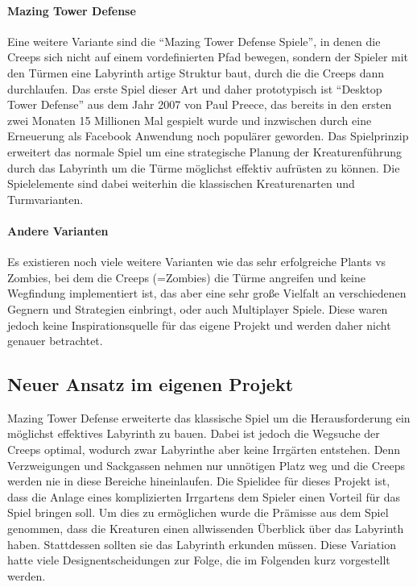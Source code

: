 \paragraph{Mazing Tower Defense}
Eine weitere Variante sind die \enquote{Mazing Tower Defense Spiele}, in denen die Creeps sich nicht auf einem vordefinierten Pfad bewegen, sondern der Spieler mit den Türmen eine Labyrinth artige Struktur baut, durch die die Creeps dann durchlaufen. Das erste Spiel dieser Art und daher prototypisch ist \enquote{Desktop Tower Defense} aus dem Jahr 2007 von Paul Preece, das bereits in den ersten zwei Monaten 15 Millionen Mal gespielt wurde und inzwischen durch eine Erneuerung als Facebook Anwendung noch populärer geworden. Das Spielprinzip erweitert das normale Spiel um eine strategische Planung der Kreaturenführung durch das Labyrinth um die Türme möglichst effektiv aufrüsten zu können. Die Spielelemente sind dabei weiterhin die klassischen Kreaturenarten und Turmvarianten.


\paragraph{Andere Varianten} Es existieren noch viele weitere Varianten wie das sehr erfolgreiche Plants vs Zombies, bei dem die Creeps (=Zombies) die Türme angreifen und keine Wegfindung implementiert ist, das aber eine sehr große Vielfalt an verschiedenen Gegnern und Strategien einbringt, oder auch Multiplayer Spiele. Diese waren jedoch keine Inspirationsquelle für das eigene Projekt und werden daher nicht genauer betrachtet.

\subsection{Neuer Ansatz im eigenen Projekt}

Mazing Tower Defense erweiterte das klassische Spiel um die Herausforderung ein möglichst effektives Labyrinth zu bauen. Dabei ist jedoch die Wegsuche der Creeps optimal, wodurch zwar Labyrinthe aber keine Irrgärten entstehen. Denn Verzweigungen und Sackgassen nehmen nur unnötigen Platz weg und die Creeps werden nie in diese Bereiche hineinlaufen. Die Spielidee für dieses Projekt ist, dass die Anlage eines komplizierten Irrgartens dem Spieler einen Vorteil für das Spiel bringen soll. Um dies zu ermöglichen wurde die Prämisse aus dem Spiel genommen, dass die Kreaturen einen allwissenden Überblick über das Labyrinth haben. Stattdessen sollten sie das Labyrinth erkunden müssen. Diese Variation hatte viele Designentscheidungen zur Folge, die im Folgenden kurz vorgestellt werden.

